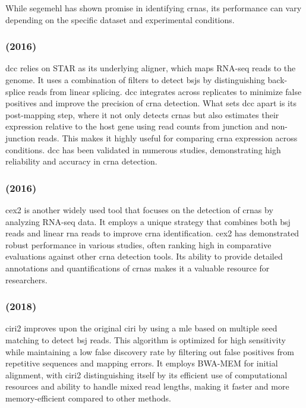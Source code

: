 While \gls{segemehl} has shown promise in identifying \glspl{crna}, its
performance can vary depending on the specific dataset and experimental
conditions\supercite{gao_ciri_2015,zeng_comprehensive_2017}.

\subsubsection{ (2016)}
\Gls{dcc} relies on STAR as its underlying aligner, which maps RNA-seq reads to
the
genome.
It uses a combination of filters to detect \glspl{bsj} by distinguishing
back-splice reads from linear splicing.
\Gls{dcc} integrates across replicates to minimize false positives and improve
the
precision of \gls{crna} detection.
What sets \gls{dcc} apart is its post-mapping step, where it not only detects
\glspl{crna} but also estimates their expression relative to the host gene
using read counts from junction and non-junction reads.
This makes it highly useful for comparing \gls{crna} expression across
conditions\supercite{cheng_specific_2016}.
\Gls{dcc} has been validated in numerous studies, demonstrating high
reliability and
accuracy in \gls{crna} detection\supercite{paraboschi_interpreting_2018}.

\subsubsection{ (2016)}
\Gls{cex2} is another widely used tool that focuses on the detection of
\glspl{crna} by analyzing RNA-seq data.
It employs a unique strategy that combines both \gls{bsj} reads and linear \gls{rna}
reads to improve \gls{crna} identification.
\Gls{cex2} has demonstrated robust performance in various studies, often
ranking high in comparative evaluations against other \gls{crna} detection
tools\supercite{zeng_comprehensive_2017,nicolet_circular_2018}.
Its ability to provide detailed annotations and quantifications of \glspl{crna}
makes it a valuable resource for researchers\supercite{hansen_comparison_2016}.

\subsubsection{ (2018)}
\Gls{ciri2} improves upon the original \gls{ciri}\supercite{gao_ciri_2015} by
using a \gls{mle} based on multiple seed matching to detect \gls{bsj} reads.
This algorithm is optimized for high sensitivity while maintaining a low false
discovery rate by filtering out false positives from repetitive sequences and
mapping errors.
It employs BWA-MEM\supercite{li_fast_2009} for initial alignment, with
\gls{ciri2} distinguishing itself by its efficient use of computational
resources and ability to handle mixed read lengths, making it faster and more
memory-efficient compared to other methods\supercite{gao_circular_2018}.
